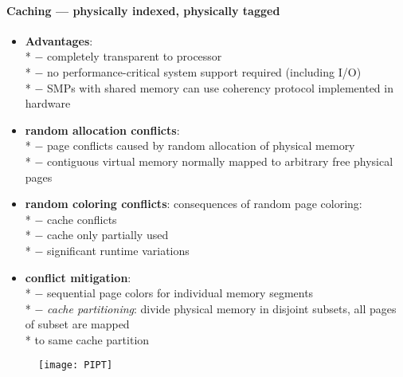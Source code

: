 \paragraph{Caching --- physically indexed, physically tagged}
\begin{itemize}
  \item \textbf{Advantages}: \\*
    $ - $ completely transparent to processor \\*
    $ - $ no performance-critical system support required (including I/O) \\*
    $ - $ SMPs with shared memory can use coherency protocol implemented in hardware
  \item \textbf{random allocation conflicts}: \\*
    $ - $ page conflicts caused by random allocation of physical memory \\*
    $ - $ contiguous virtual memory normally mapped to arbitrary free physical pages
  \item \textbf{random coloring conflicts}: consequences of random page coloring: \\*
    $ - $ cache conflicts \\*
    $ - $ cache only partially used \\*
    $ - $ significant runtime variations
  \item \textbf{conflict mitigation}: \\*
    $ - $ sequential page colors for individual memory segments \\*
    $ - $ \emph{cache partitioning}: divide physical memory in disjoint subsets, all pages of subset are mapped \\* \phantom{$ - $} \phantom{$ \cdot $} to same cache partition
\end{itemize}
\begin{figure}[h]\centering\label{PIPT}\texttt{[image: PIPT]}\end{figure}